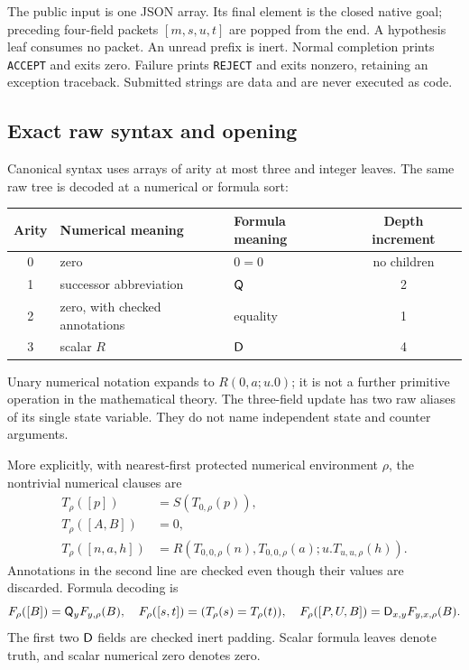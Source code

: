 The public input is one JSON array. Its final element is the closed
native goal; preceding four-field packets $[m,s,u,t]$ are popped from
the end. A hypothesis leaf consumes no packet. An unread prefix is
inert. Normal completion prints \texttt{ACCEPT} and exits zero.
Failure prints \texttt{REJECT} and exits nonzero, retaining an exception
traceback. Submitted strings are data and are never executed as code.

\subsection{Exact raw syntax and opening}

Canonical syntax uses arrays of arity at most three and integer leaves.
The same raw tree is decoded at a numerical or formula sort:
\begin{center}\small
\begin{tabular}{cllc}
\toprule
Arity & Numerical meaning & Formula meaning & Depth increment\\
\midrule
0 & zero & $0=0$ & no children\\
1 & successor abbreviation & $\mathsf Q$ & 2\\
2 & zero, with checked annotations & equality & 1\\
3 & scalar $R$ & $\mathsf D$ & 4\\
\bottomrule
\end{tabular}
\end{center}
Unary numerical notation expands to $R(0,a;u.0)$; it is not a further
primitive operation in the mathematical theory. The three-field update
has two raw aliases of its single state variable. They do not name
independent state and counter arguments.

More explicitly, with nearest-first protected numerical environment
$\rho$, the nontrivial numerical clauses are
\[
\begin{aligned}
T_\rho([p])&=S(T_{0,\rho}(p)),\\
T_\rho([A,B])&=0,\\
T_\rho([n,a,h])&=
R(T_{0,0,\rho}(n),T_{0,0,\rho}(a);
        u.T_{u,u,\rho}(h)).
\end{aligned}
\]
Annotations in the second line are checked even though their values are
discarded. Formula decoding is
\[
F_\rho([B])=\mathsf Q_yF_{y,\rho}(B),\quad
F_\rho([s,t])=(T_\rho(s)=T_\rho(t)),\quad
F_\rho([P,U,B])=\mathsf D_{x,y}F_{y,x,\rho}(B).
\]
The first two $\mathsf D$ fields are checked inert padding. Scalar formula
leaves denote truth, and scalar numerical zero denotes zero.

